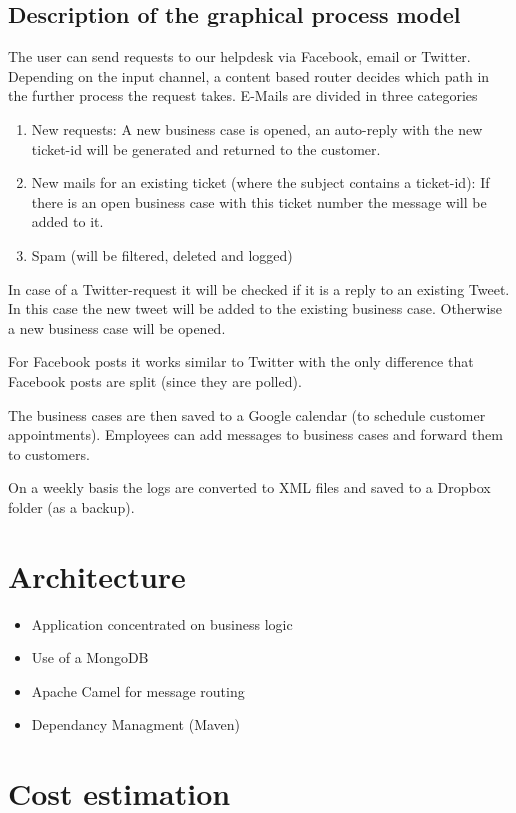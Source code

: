 \subsection{Description of the graphical process model}
The user can send requests to our helpdesk via Facebook, email or Twitter. Depending on the input channel, a content based router decides which path in the further process the request takes. E-Mails are divided in three categories
\begin{enumerate}
\item New requests: A new business case is opened, an auto-reply with the new ticket-id will be generated and returned to the customer. 
\item New mails for an existing ticket (where the subject contains a ticket-id): If there is an open business case with this ticket number the message will be added to it.
\item Spam (will be filtered, deleted and logged)
\end{enumerate}
In case of a Twitter-request it will be checked if it is a reply to an existing Tweet. In this case the new tweet will be added to the existing business case. Otherwise a new business case will be opened.

For Facebook posts it works similar to Twitter with the only difference that Facebook posts are split (since they are polled). 

The business cases are then saved to a Google calendar (to schedule customer appointments). 
Employees can add messages to business cases and forward them to customers.

On a weekly basis the logs are converted to XML files and saved to a Dropbox folder (as a backup).

\section{Architecture}
\begin{itemize}
    \item Application concentrated on business logic
    \item Use of a MongoDB
    \item Apache Camel for message routing
    \item Dependancy Managment (Maven)
\end{itemize}

\section{Cost estimation\label{sec:costest}}

